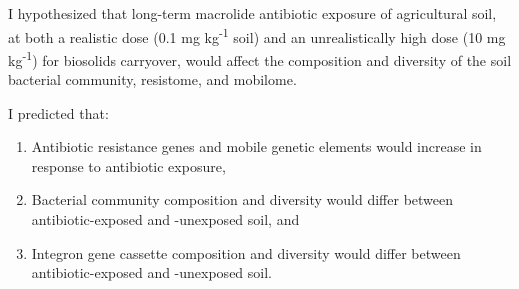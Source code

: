 I hypothesized that long-term macrolide antibiotic exposure of agricultural soil, at both a realistic dose (0.1 mg kg\textsuperscript{-1} soil) and an unrealistically high dose (10 mg kg\textsuperscript{-1}) for biosolids carryover, would affect the composition and diversity of the soil bacterial community, resistome, and mobilome.

I predicted that:

\begin{enumerate}
  \item{Antibiotic resistance genes and mobile genetic elements would increase in response to antibiotic exposure,}
  \item{Bacterial community composition and diversity would differ between antibiotic-exposed and -unexposed soil, and}
  \item{Integron gene cassette composition and diversity would differ between antibiotic-exposed and -unexposed soil.}
\end{enumerate}
